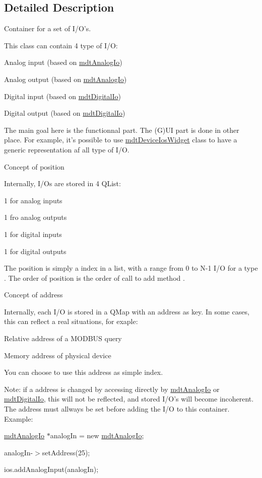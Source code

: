 \subsection{Detailed Description}
Container for a set of I/O's. 

This class can contain 4 type of I/O:
\begin{DoxyItemize}
\item Analog input (based on \hyperlink{classmdt_analog_io}{mdtAnalogIo})
\item Analog output (based on \hyperlink{classmdt_analog_io}{mdtAnalogIo})
\item Digital input (based on \hyperlink{classmdt_digital_io}{mdtDigitalIo})
\item Digital output (based on \hyperlink{classmdt_digital_io}{mdtDigitalIo})
\end{DoxyItemize}

The main goal here is the functionnal part. The (G)UI part is done in other place. For example, it's possible to use \hyperlink{classmdt_device_ios_widget}{mdtDeviceIosWidget} class to have a generic representation af all type of I/O.

Concept of position

Internally, I/Os are stored in 4 QList:
\begin{DoxyItemize}
\item 1 for analog inputs
\item 1 fro analog outputs
\item 1 for digital inputs
\item 1 for digital outputs
\end{DoxyItemize}

The position is simply a index in a list, with a range from 0 to N-\/1 I/O for a type . The order of position is the order of call to add method .

Concept of address

Internally, each I/O is stored in a QMap with an address as key. In some cases, this can reflect a real situations, for exaple:
\begin{DoxyItemize}
\item Relative address of a MODBUS query
\item Memory address of physical device
\end{DoxyItemize}

You can choose to use this address as simple index.

Note: if a address is changed by accessing directly by \hyperlink{classmdt_analog_io}{mdtAnalogIo} or \hyperlink{classmdt_digital_io}{mdtDigitalIo}, this will not be reflected, and stored I/O's will become incoherent. The address must allways be set before adding the I/O to this container. Example:
\begin{DoxyItemize}
\item \hyperlink{classmdt_analog_io}{mdtAnalogIo} $\ast$analogIn = new \hyperlink{classmdt_analog_io}{mdtAnalogIo};
\item analogIn-\/$>$setAddress(25);
\item ios.addAnalogInput(analogIn);
\end{DoxyItemize}

